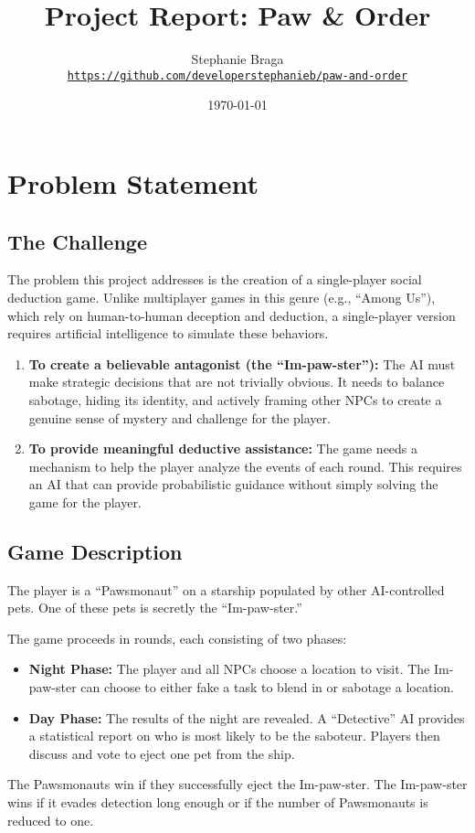 \documentclass{article}
\title{\textbf{Project Report: Paw \& Order}}
\author{Stephanie Braga \\
    \texttt{\small\url{https://github.com/developerstephanieb/paw-and-order}}}
\date{\today}
\begin{document}
\maketitle

\section{Problem Statement}

\subsection{The Challenge}

The problem this project addresses is the creation of a single-player social deduction game. Unlike multiplayer games in this genre (e.g., ``Among Us''), which rely on human-to-human deception and deduction, a single-player version requires artificial intelligence to simulate these behaviors.
\begin{enumerate}
    \item \textbf{To create a believable antagonist (the ``Im-paw-ster''):} The AI must make strategic decisions that are not trivially obvious. It needs to balance sabotage, hiding its identity, and actively framing other NPCs to create a genuine sense of mystery and challenge for the player.
    \item \textbf{To provide meaningful deductive assistance:} The game needs a mechanism to help the player analyze the events of each round. This requires an AI that can provide probabilistic guidance without simply solving the game for the player.
\end{enumerate}

\subsection{Game Description}
The player is a ``Pawsmonaut'' on a starship populated by other AI-controlled pets. One of these pets is secretly the ``Im-paw-ster.''

The game proceeds in rounds, each consisting of two phases:
\begin{itemize}
    \item \textbf{Night Phase:} The player and all NPCs choose a location to visit. The Im-paw-ster can choose to either fake a task to blend in or sabotage a location.
    \item \textbf{Day Phase:} The results of the night are revealed. A ``Detective'' AI provides a statistical report on who is most likely to be the saboteur. Players then discuss and vote to eject one pet from the ship.
\end{itemize}
The Pawsmonauts win if they successfully eject the Im-paw-ster. The Im-paw-ster wins if it evades detection long enough or if the number of Pawsmonauts is reduced to one.
\end{document}
